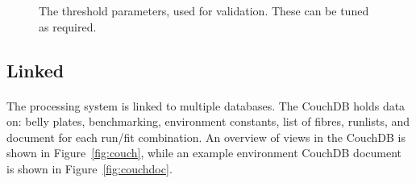 \documentclass[12pt]{article}
\begin{document}
\begin{figure}
\centering
\noindent{}
  \caption{\centering The threshold parameters, used for validation. These can be tuned as required.}
  \label{fig:thresh}
\end{figure}

\subsection{Linked}
\paragraph{}
The processing system is linked to multiple databases. The CouchDB holds data on: belly plates, benchmarking, environment constants, list of fibres, runlists, and document for each run/fit combination. An overview of views in the CouchDB is shown in Figure~\ref{fig:couch}, while an example environment CouchDB document is shown in Figure~\ref{fig:couchdoc}.
\end{document}
